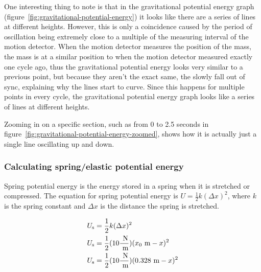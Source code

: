 \documentclass[titlepage]{article}
\begin{document}
                
                One interesting thing to note is that in the gravitational potential energy graph (figure~\ref{fig:gravitational-potential-energy}) it looks like there are a series of lines at different heights.
                However, this is only a coincidence caused by the period of oscillation being extremely close to a multiple of the measuring interval of the motion detector.
                When the motion detector measures the position of the mass, the mass is at a similar position to when the motion detector measured exactly one cycle ago, thus the gravitational potential energy looks very similar to a previous point, but because they aren't the exact same, the slowly fall out of sync, explaining why the lines start to curve.
                Since this happens for multiple points in every cycle, the gravitational potential energy graph looks like a series of lines at different heights.
                
                Zooming in on a specific section, such as from 0 to 2.5 seconds in figure~\ref{fig:gravitational-potential-energy-zoomed}, shows how it is actually just a single line oscillating up and down.
            
            \subsubsection{Calculating spring/elastic potential energy}
                Spring potential energy is the energy stored in a spring when it is stretched or compressed.
                The equation for spring potential energy is $U = \frac{1}{2}k(\Delta x)^2$, where $k$ is the spring constant and $\Delta x$ is the distance the spring is stretched.
                
                \begin{equation}
                    \begin{aligned}
                        \small
                        U_{\text{s}} &= \frac{1}{2}k(\Delta x)^2 \\
                        U_{\text{s}} &= \frac{1}{2}(10 \frac{\text{ N}}{\text{ m}})(x_0 \text{ m} - x)^2 \\
                        U_{\text{s}} &= \frac{1}{2}(10 \frac{\text{ N}}{\text{ m}})(0.328 \text{ m} - x)^2 \\
                    \end{aligned}\label{eq:spring-potential-energy-equation}
                \end{equation}
                
\end{document}
